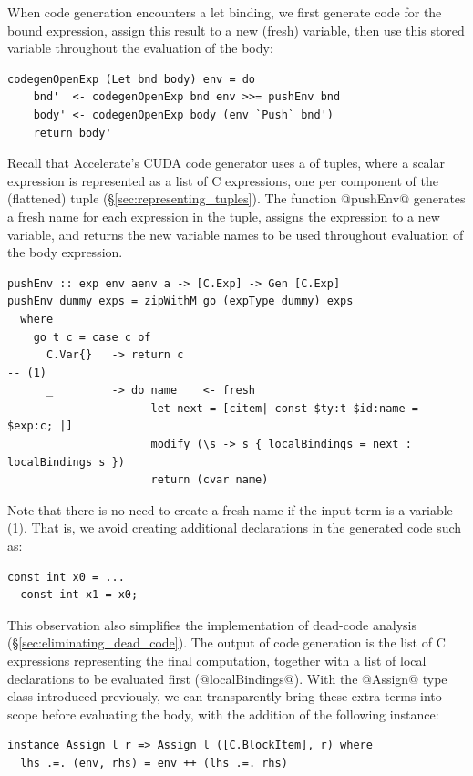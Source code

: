 When code generation encounters a let binding, we first generate code for the
bound expression, assign this result to a new (fresh) variable, then use this
stored variable throughout the evaluation of the body:
%
\begin{lstlisting}[style=haskell]
codegenOpenExp (Let bnd body) env = do
    bnd'  <- codegenOpenExp bnd env >>= pushEnv bnd
    body' <- codegenOpenExp body (env `Push` bnd')
    return body'
\end{lstlisting}

Recall that Accelerate's CUDA code generator uses a  of tuples, where a scalar expression is represented as a list of
C expressions, one per component of the (flattened) tuple
(\S\ref{sec:representing_tuples}). The function @pushEnv@ generates a fresh name
for each expression in the tuple, assigns the expression to a new variable, and
returns the new variable names to be used throughout evaluation of the body
expression.
%
\begin{lstlisting}[style=haskell]
pushEnv :: exp env aenv a -> [C.Exp] -> Gen [C.Exp]
pushEnv dummy exps = zipWithM go (expType dummy) exps
  where
    go t c = case c of
      C.Var{}   -> return c                                                        -- (1)
      _         -> do name    <- fresh
                      let next = [citem| const $ty:t $id:name = $exp:c; |]
                      modify (\s -> s { localBindings = next : localBindings s })
                      return (cvar name)
\end{lstlisting}
%
Note that there is no need to create a fresh name if the input term is a
variable (1). That is, we avoid creating additional declarations in the
generated code such as:
%
\begin{lstlisting}[language=cuda]
  const int x0 = ...
  const int x1 = x0;
\end{lstlisting}
%
This observation also simplifies the implementation of dead-code analysis
(\S\ref{sec:eliminating_dead_code}). The output of code generation is the list
of C expressions representing the final computation, together with a list of
local declarations to be evaluated first (@localBindings@). With the @Assign@
type class introduced previously, we can transparently bring these extra terms
into scope before evaluating the body, with the addition of the following
instance:
%
\begin{lstlisting}[style=haskell]
instance Assign l r => Assign l ([C.BlockItem], r) where
  lhs .=. (env, rhs) = env ++ (lhs .=. rhs)
\end{lstlisting}

